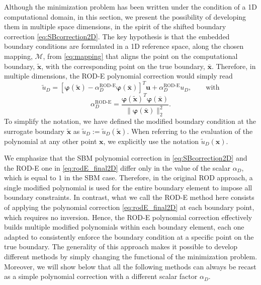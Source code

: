 \documentclass{article}
\renewcommand{\phi}{\varphi}
\begin{document}
Although the minimization problem has been written under the condition of a 1D computational domain, in this section, we present the possibility of developing them in multiple space dimensions, in the spirit of the shifted boundary correction \eqref{eq:SBcorrection2D}. The key hypothesis is that the embedded boundary conditions are formulated in a 1D reference space, along the chosen mapping, $\mathcal{M}$, from \eqref{eq:mapping} that aligns the point on the computational boundary, $\tilde{\boldsymbol{x}}$, with the corresponding point on the true boundary, $\bar{\boldsymbol{x}}$. Therefore, in multiple dimensions, the ROD-E polynomial correction would simply read
\begin{equation}\label{eq:rodE_final2D}
    \tilde{u}_D = [\boldsymbol{\phi}(\tilde{\boldsymbol{x}}) - \alpha^{\text{ROD-E}}_D \boldsymbol{\phi}(\bar{\boldsymbol{x}})]^T \boldsymbol{u} + \alpha^{\text{ROD-E}}_D u_D , \quad \quad \text{with}
\end{equation}
\begin{equation}
    \alpha^{\text{ROD-E}}_D = \frac{\boldsymbol{\phi}(\tilde{\boldsymbol{x}})^T \boldsymbol{\phi}(\bar{\boldsymbol{x}})}{\|\boldsymbol{\phi}(\bar{\boldsymbol{x}})\|^2_2}.   
\end{equation}
%
To simplify the notation, we have defined the modified boundary condition at the surrogate boundary $\tilde{\boldsymbol{x}}$ as $\tilde{u}_D := \tilde{u}_D(\tilde{\boldsymbol{x}})$. When referring to the evaluation of the polynomial at any other point $\boldsymbol{x}$, we explicitly use the notation $\tilde{u}_D(\boldsymbol{x})$.

We emphasize that the SBM polynomial correction in \eqref{eq:SBcorrection2D} and the ROD-E one in \eqref{eq:rodE_final2D} differ only in the value of the scalar $\alpha_D$, which is equal to $1$ in the SBM case. Therefore, in the original ROD approach, a single modified polynomial is used for the entire boundary element to impose all boundary constraints. In contrast, what we call the ROD-E method here consists of applying the polynomial correction \eqref{eq:rodE_final2D} at each boundary point, which requires no inversion. Hence, the ROD-E polynomial correction effectively builds multiple modified polynomials within each boundary element, each one adapted to consistently enforce the boundary condition at a specific point on the true boundary. The generality of this approach makes it possible to develop different methods by simply changing the functional of the minimization problem. Moreover, we will show below that all the following methods can always be recast as a simple polynomial correction with a different scalar factor $\alpha_D$.
\end{document}
